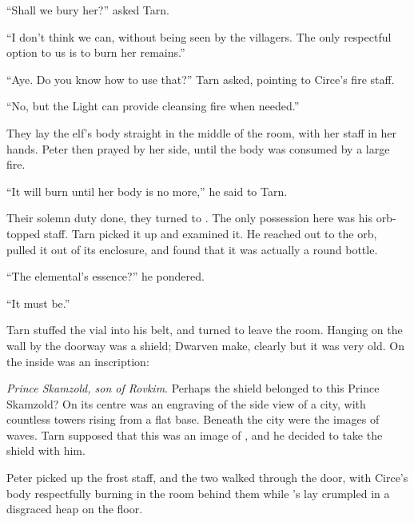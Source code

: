 ``Shall we bury her?'' asked Tarn.

``I don't think we can, without being seen by the villagers.  The only respectful option to us is to burn her remains.''

``Aye.  Do you know how to use that?'' Tarn asked, pointing to Circe's fire staff.

``No, but the Light can provide cleansing fire when needed.''

They lay the elf's body straight in the middle of the room, with her staff in her hands.  Peter then prayed by her side, until the body was consumed by a large fire.

``It will burn until her body is no more,'' he said to Tarn.


Their solemn duty done, they turned to \mothzam \driktur.  The only possession here was his orb-topped staff.  Tarn picked it up and examined it.  He reached out to the orb, pulled it out of its enclosure, and found that it was actually a round bottle.

``The elemental's essence?'' he pondered.

``It must be.''

Tarn stuffed the vial into his belt, and turned to leave the room.  Hanging on the wall by the doorway was a shield; Dwarven make, clearly but it was very old.  On the inside was an inscription:


\emph{Prince Skamzold, son of Rovkim}.  Perhaps the shield belonged to this Prince Skamzold? On its centre was an engraving of the side view of a city, with countless towers rising from a flat base.  Beneath the city were the images of waves.  Tarn supposed that this was an image of \valdunmir, and he decided to take the shield with him.

Peter picked up the frost staff, and the two walked through the door, with Circe's body respectfully burning in the room behind them while \mothzam's lay crumpled in a disgraced heap on the floor.
